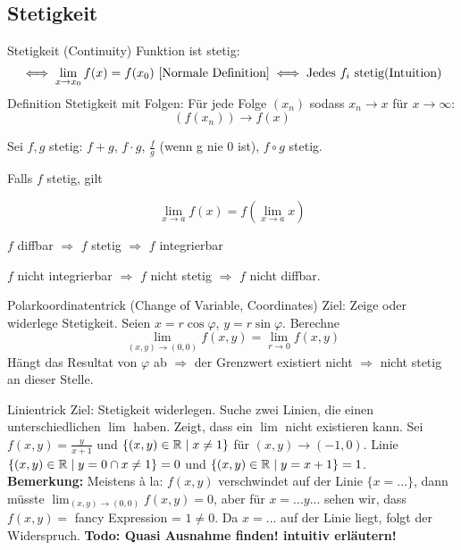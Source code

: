 \subsection{Stetigkeit}

\begin{Definition}{Stetigkeit (Continuity)}{}
    Funktion ist stetig:
    \begin{equation*}
     \iff \lim_{x\rightarrow x_0} f(x) = f(x_0) \text{  [Normale Definition]} \iff \text{Jedes $f_i$ stetig} \text{(Intuition)}\\
    \end{equation*}
    Definition Stetigkeit mit Folgen: Für jede Folge $(x_n)$ sodass $x_n \rightarrow x$ für $x\rightarrow \infty $:
    \[
    (f(x_n)) \rightarrow f(x)
    \]
\end{Definition}

Sei $f,g$ stetig: $f+g$, $f\cdot g$, $\frac{f}{g}$ (wenn g nie 0 ist), $f \circ g$ stetig.

Falls $f$ stetig, gilt

\[
    \lim_{x \rightarrow a} f(x) = f(\lim_{x\rightarrow a} x)
\]

$f$ diffbar $\Rightarrow$ $f$ stetig $\Rightarrow$ $f$ integrierbar

$f$ nicht integrierbar $\Rightarrow$ $f$ nicht stetig $\Rightarrow$ $f$ nicht diffbar.

\begin{Rezept}{Polarkoordinatentrick (Change of Variable, Coordinates)}{}
    Ziel: Zeige oder widerlege Stetigkeit. Seien $x=r\cos \varphi$, $y=r\sin \varphi$. Berechne
    \[
    \lim_{(x, y) \rightarrow (0,0)} f(x, y) = \lim_{r \rightarrow 0} f(x, y)
    \]
    Hängt das Resultat von $\varphi$ ab $\Rightarrow$ der Grenzwert existiert nicht $\Rightarrow$ nicht stetig an dieser Stelle.
\end{Rezept}

\begin{Rezept}{Linientrick}{}
    Ziel: Stetigkeit widerlegen. Suche zwei Linien, die einen unterschiedlichen $\lim$ haben. Zeigt, dass ein $\lim$ nicht existieren kann.
    Sei $f(x, y)=\frac{y}{x+1}$ und $\{(x, y) \in \mathbb{R} \mid x \neq 1\}$ für $(x, y) \rightarrow (-1, 0)$. Linie $\{(x, y) \in \mathbb{R} \mid y=0\cap x \neq 1\}=0$ und $\{(x, y) \in \mathbb{R} \mid y=x+1\}=1$.\\
    
    \textbf{Bemerkung:} Meistens à la: $f(x,y)$ verschwindet auf der Linie $\{x=...\}$, dann müsste $\lim_{(x,y)\rightarrow(0,0)} f(x,y) = 0$, aber für $x=...y...$ sehen wir, dass
    $f(x,y) =$ fancy Expression = $1 \neq 0$. Da $x=...$ auf der Linie liegt, folgt der Widerspruch. \textbf{Todo: Quasi Ausnahme finden! intuitiv erläutern!}
\end{Rezept}

